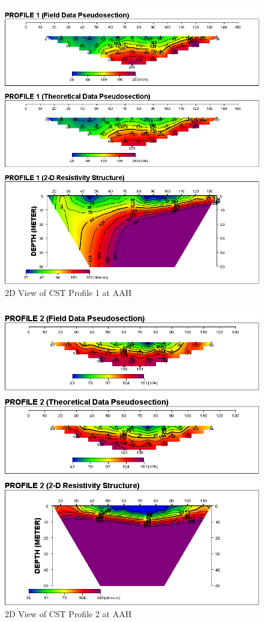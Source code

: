 \documentclass[12pt,a4paper]{report}
\begin{document}
\begin{figure}[H]
    \centering
    \includegraphics[width=1.0\textwidth]{PROFILE 1D (1).png}
    \caption{2D View of CST Profile 1 at AAH}
    \label{fig:AAH_CST_1_Curve}
\end{figure}

\begin{figure}[H]
    \centering
    \includegraphics[width=1.0\textwidth]{PROFILE 2D (1).png}
    \caption{2D View of CST Profile 2 at AAH}
    \label{fig:aah_CST_2_Curve}
\end{figure}
\end{document}
